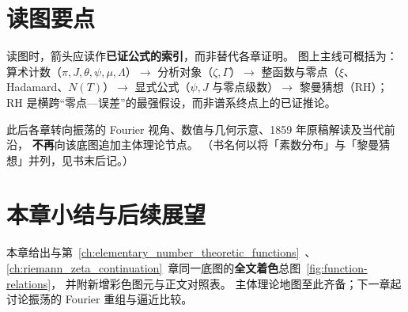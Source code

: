 \section{读图要点}
\label{sec:spectrum_reading}

读图时，箭头应读作\textbf{已证公式的索引}，而非替代各章证明。
图上主线可概括为：
算术计数（$\pi,J,\theta,\psi,\mu,\Lambda$）$\to$ 分析对象（$\zeta,\Gamma$）$\to$
整函数与零点（$\xi$、Hadamard、$N(T)$）$\to$ 显式公式（$\psi,J$ 与零点级数）$\to$ 黎曼猜想（RH）；
RH 是横跨“零点—误差”的最强假设，而非谱系终点上的已证推论。

此后各章转向振荡的 Fourier 视角、数值与几何示意、1859 年原稿解读及当代前沿，
\textbf{不再}向该底图追加主体理论节点。
（书名何以将「素数分布」与「黎曼猜想」并列，见书末后记。）

\section*{本章小结与后续展望}

本章给出与第~\ref{ch:elementary_number_theoretic_functions}~、
\ref{ch:riemann_zeta_continuation}~章同一底图的\textbf{全文着色}总图~\ref{fig:function-relations}，
并附新增彩色图元与正文对照表。
主体理论地图至此齐备；下一章起讨论振荡的 Fourier 重组与逼近比较。
